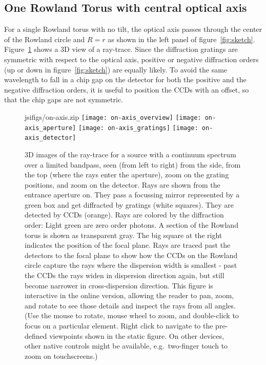 \documentclass[twocolumn]{aastex631}
\begin{document}
\subsection{One Rowland Torus with central optical axis}
\label{sect:onetorus}
For a single Rowland torus with no tilt, the optical axis passes through the center of the Rowland circle and $R=r$ as shown in the left panel of figure~\ref{fig:sketch}. Figure~\ref{fig:3d:single} shows a 3D view of a ray-trace. Since the diffraction gratings are symmetric with respect to the optical axis, positive or negative diffraction orders (up or down in figure~\ref{fig:sketch}) are equally likely.
To avoid the same wavelength to fall in a chip gap on the detector for both the positive and the negative diffraction orders, it is useful to position the CCDs with an offset, so that the chip gaps are not symmetric.
\begin{figure}
  \begin{interactive}{js}{ifigs/on-axis.zip}
  \texttt{[image: on-axis\_overview]}
  \texttt{[image: on-axis\_aperture]}
  \texttt{[image: on-axis\_gratings]}
  \texttt{[image: on-axis\_detector]}
  \end{interactive}
\caption{3D images of the ray-trace for a source with a continuum spectrum over a limited bandpass, seen (from left to right) from the side, from the top (where the rays enter the aperture), zoom on the grating positions, and zoom on the detector. Rays are shown from the entrance aperture on. They pass a focussing mirror represented by a green box and get diffracted by gratings (white squares). They are detected by CCDs (orange). Rays are colored by the diffraction order: Light green are zero order photons. A section of the Rowland torus is shown as transparent gray. The big square at the right indicates the position of the focal plane. Rays are traced past the detectors to the focal plane to show how the CCDs on the Rowland circle capture the rays where the dispersion width is smallest - past the CCDs the rays widen in dispersion direction again, but still become narrower in cross-dispersion direction. This figure is interactive in the online version, allowing the reader to pan, zoom, and rotate to see those details and inspect the rays from all angles. (Use the mouse to rotate, mouse wheel to zoom, and double-click to focus on a particular element. Right click to navigate to the pre-defined viewpoints shown in the static figure. On other devices, other native controls might be available, e.g.\ two-finger touch to zoom on touchscreens.)
\label{fig:3d:single}}

\end{figure}
\end{document}
